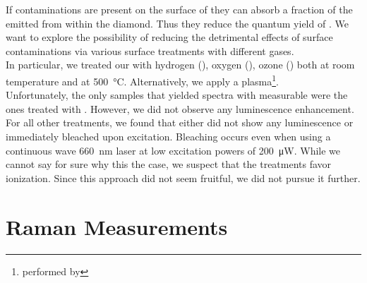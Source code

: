 				If contaminations are present on the surface of \nds they can absorb a fraction of the \fl emitted from within the diamond. Thus they reduce the quantum yield of \sivs. We want to explore the possibility of reducing the detrimental effects of surface contaminations via various surface treatments with different gases.
				\\
				In particular, we treated our \nds with hydrogen (), oxygen (), ozone () both at room temperature and at  \SI{500}{\celsius}. Alternatively, we apply a  plasma\footnote{performed by \williams}.
				\\
				Unfortunately, the only samples that yielded spectra with measurable \ZPLs were the ones treated with . However, we did not observe any luminescence enhancement.
				\\
				For all other treatments, we found that \nds either did not show any luminescence or immediately bleached upon excitation. Bleaching occurs even when using a continuous wave \SI{660}{nm} laser at low excitation powers of \SI{200}{\micro\watt}. While we cannot say for sure why this the case, we suspect that the treatments favor \siv ionization. Since this approach did not seem fruitful, we did not pursue it further.
				\\

		\section{Raman Measurements}

